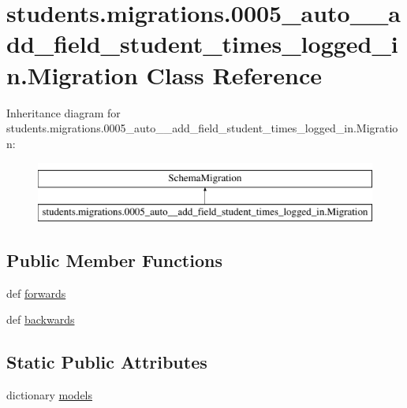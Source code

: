 \hypertarget{classstudents_1_1migrations_1_10005__auto____add__field__student__times__logged__in_1_1_migration}{\section{students.\-migrations.0005\-\_\-auto\-\_\-\-\_\-add\-\_\-field\-\_\-student\-\_\-times\-\_\-logged\-\_\-in.Migration Class Reference}
\label{classstudents_1_1migrations_1_10005__auto____add__field__student__times__logged__in_1_1_migration}
}
Inheritance diagram for students.\-migrations.0005\-\_\-auto\-\_\-\-\_\-add\-\_\-field\-\_\-student\-\_\-times\-\_\-logged\-\_\-in.Migration\-:\begin{figure}[H]
\begin{center}
\leavevmode
\includegraphics[height=2.000000cm]{classstudents_1_1migrations_1_10005__auto____add__field__student__times__logged__in_1_1_migration}
\end{center}
\end{figure}
\subsection*{Public Member Functions}
\begin{DoxyCompactItemize}
\item 
def \hyperlink{classstudents_1_1migrations_1_10005__auto____add__field__student__times__logged__in_1_1_migration_aefa02ac46c43ced3f3cd7b9551660e8f}{forwards}
\item 
def \hyperlink{classstudents_1_1migrations_1_10005__auto____add__field__student__times__logged__in_1_1_migration_a14280cab7177a420441ed1e484422d97}{backwards}
\end{DoxyCompactItemize}
\subsection*{Static Public Attributes}
\begin{DoxyCompactItemize}
\item 
dictionary \hyperlink{classstudents_1_1migrations_1_10005__auto____add__field__student__times__logged__in_1_1_migration_aa96b2fe7dad0ea621ed20c777dcfdbcc}{models}
\end{DoxyCompactItemize}


